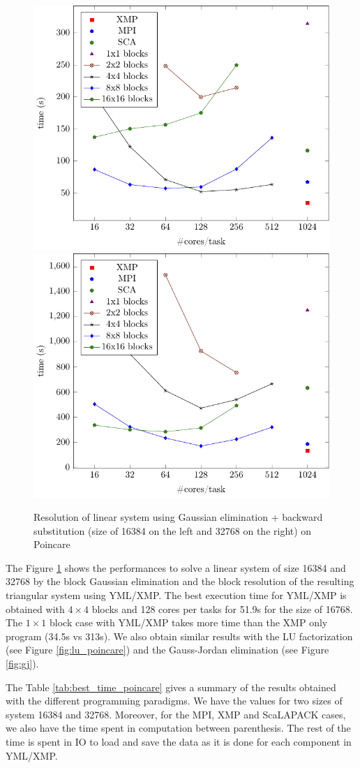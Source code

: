 \begin{figure}[h]
	\caption{Resolution of linear system using Gaussian elimination + backward substitution (size of 16384 on the left and 32768 on the right) on Poincare\label{fig:g1}}
	\centering
	\includegraphics[width=.49\textwidth]{fig-g-16k.pdf}
	\includegraphics[width=.49\textwidth]{fig-g-32k.pdf}
\end{figure}

The Figure \ref{fig:g1} shows the performances to solve a linear system of size 16384 and 32768 by the block Gaussian elimination and the block resolution of the resulting triangular system using YML/XMP.
The best execution time for YML/XMP is obtained with $4 \times 4$ blocks and 128 cores per tasks for 51.9s for the size of 16768.
The $1 \times 1$ block case with YML/XMP takes more time than the XMP only program (34.5s vs 313s).
We also obtain similar results with the LU factorization (see Figure \ref{fig:lu_poincare}) and the Gauss-Jordan elimination (see Figure \ref{fig:gj}).

The Table \ref{tab:best_time_poincare} gives a summary of the results obtained with the different programming paradigms.
We have the values for two sizes of system 16384 and 32768.
Moreover, for the MPI, XMP and ScaLAPACK cases, we also have the time spent in computation between parenthesis.
The rest of the time is spent in IO to load and save the data as it is done for each component in YML/XMP.

